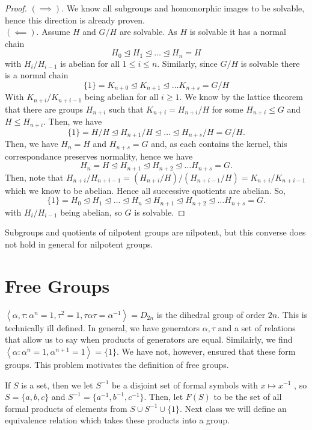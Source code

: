 \begin{proof}
	\(\left( \implies \right) \). We know all subgroups and homomorphic images to be solvable, hence this direction is already proven.\\
	\(\left( \impliedby \right) \). Assume \(H\) and \(G / H\) are solvable. As \(H\) is solvable it has a normal chain \[
	H_0 \trianglelefteq H_1 \trianglelefteq \ldots \trianglelefteq H_{n} = H
	\]  with \(H_{i} / H_{i - 1}\) is abelian for all \(1 \le i \le n\). Similarly, since \(G / H\) is solvable there is a normal chain \[
	\{1\}  = K_{n + 0} \trianglelefteq K_{n + 1} \trianglelefteq \ldots K_{n + s} = G / H
	\]
	With \(K_{n + i} / K_{n + i - 1}\) being abelian for all \(i \ge 1\). We know by the lattice theorem that there are groups \(H_{n + i}\) such that \(K_{ n + i} = H_{n + i} / H\) for some \(H _{n + i} \le G\) and \(H \le H_{n + i}\). Then, we have \[
	\{1\}  = H / H \trianglelefteq H_{n + 1} / H \trianglelefteq \ldots \trianglelefteq H_{n + s} / H = G / H
	.\]
	Then, we have \(H_{n} = H\) and \(H_{n + s} = G\) and, as each contains the kernel, this correspondance preserves normality, hence we have \[
	H_{n} = H\trianglelefteq H_{n + 1} \trianglelefteq H_{n + 2} \trianglelefteq \ldots H_{n + s}  = G
	.\]
	Then, note that \(H_{ n + i} / H_{ n + i - 1} = \left( H_{n + i} / H \right) / \left( H_{n + i - 1} / H \right) = K_{n + i} / K_{n + i - 1} \) which we know to be abelian. Hence all successive quotients are abelian. So, \[
	\{1\}  = H_0 \trianglelefteq H_1 \trianglelefteq \ldots \trianglelefteq H_{n} \trianglelefteq H_{n + 1} \trianglelefteq H_{ n + 2} \trianglelefteq \ldots H_{n + s} = G
	.\]
	with \(H_{i} / H_{ i - 1}\) being abelian, so \(G\) is solvable.
\end{proof}
\begin{remark}
	Subgroups and quotients of nilpotent groups are nilpotent, but this converse does not hold in general for nilpotent groups.
\end{remark}

\section{Free Groups}
\begin{recall}
	\(\left<\alpha, \tau : \alpha ^{n} = 1, \tau^2 = 1, \tau \alpha \tau = \alpha ^{-1} \right>  = D_{2n}\) is the dihedral group of order \(2n\). This is technically ill defined. In general, we have generators \(\alpha, \tau\) and a set of relations that allow us to say when products of generators are equal. Similairly, we find \(\left<\alpha : \alpha ^{n}=1, \alpha ^{n + 1} = 1 \right> = \{1\}  \). We have not, however, ensured that these form groups. This problem motivates the definition of free groups.
\end{recall}
	If \(S\) is a set, then we let \(S^{-1}\) be a disjoint set of formal symbols with \(x \mapsto x^{-1}\)	, so \(S = \{a, b, c\} \) and \(S^{-1} = \{a^{-1}, b^{-1}, c^{-1}\} \). Then, let \(F\left( S \right) \) to be the set of all formal products of elements from \(S \cup S^{-1} \cup \{1\} \). Next class we will define an equivalence relation which takes these products into a group.
